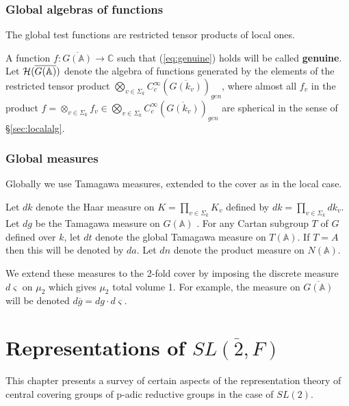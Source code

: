 \documentclass[12pt,letterpaper]{book}
\theoremstyle{plain}
\theoremstyle{definition}
\theoremstyle{remark}
\theoremstyle{remark}
\begin{document}
\subsection{Global algebras of functions}\label{sec:globalalg}

The global test functions are restricted tensor products of local ones.


A function $f:\overline{G({\mathbb{A}})}\rightarrow {\mathbb{C}}$
such that (\ref{eq:genuine})
holds will be called \textbf{genuine}. Let
${\cal{H}}(\overline{G({\mathbb{A}})})$ denote the algebra of
functions generated by the elements of the
restricted tensor product
$\bigotimes_{v\in \Sigma_k }
C_c^\infty (\overline{G(k_v)})_{gen}$,
where almost all $f_v$ in the product
$f=\otimes _{v\in \Sigma_k}f_v\in
\bigotimes_{v\in \Sigma_k }C_c^\infty (\overline{G(k_v)})_{gen}$ are
spherical in the sense of \S\ref{sec:localalg}.

\subsection{Global measures}

Globally we use Tamagawa measures, extended to the cover as in the local case.


Let $dk$ denote the Haar measure on $K=\prod_{v\in \Sigma_k }K_v$
defined by $dk=\prod_{v\in \Sigma_k }dk_v$.
Let $dg$ be the Tamagawa measure on
$G({\mathbb{A}})$ \cite{W2}. For any Cartan subgroup
$T$ of $G$ defined over $k$, let $dt$
denote the global Tamagawa measure on
$T({\mathbb{A}})$. If $T=A$ then this will
be denoted by $da$. Let $dn$ denote the product measure on $N({\mathbb{A}})$.

We extend these measures to the 2-fold cover by imposing the discrete
measure $d\varsigma $ on $\mu _2$ which gives $\mu _2$ total volume 1. For
example, the measure on $\overline{G({\mathbb{A}})}$ will be denoted
$d\overline{g}=dg\cdot d\varsigma $.



\chapter{Representations of \texorpdfstring{$\overline{SL(2,F)}$}{SL(2,F)-bar}}\label{ch:reps}

This chapter presents a survey of certain aspects of the
representation theory of central covering groups of p-adic reductive groups
in the case of $SL(2)$.
\end{document}
